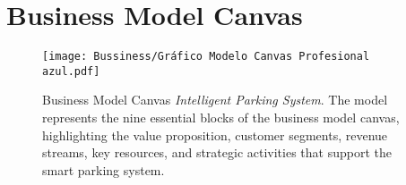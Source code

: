 \section{Business Model Canvas}

\begin{figure}[h!]
    \centering
    \texttt{[image: Bussiness/Gráfico Modelo Canvas Profesional azul.pdf]}
    \caption{Business Model Canvas \textit{Intelligent Parking System}.
    The model represents the nine essential blocks of the business model canvas, highlighting the value proposition, customer segments, revenue streams, key resources, and strategic activities that support the smart parking system.}
    \label{fig:business_model_canvas}
\end{figure}
